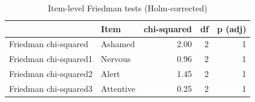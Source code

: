 \begin{table}[!h]
\centering
\caption{\label{tab:tab:item_friedman}Item-level Friedman tests (Holm-corrected)}
\centering
\begin{tabular}[t]{llrrr}
\toprule
  & Item & chi-squared & df & p (adj)\\
\midrule
Friedman chi-squared & Ashamed & 2.00 & 2 & 1\\
Friedman chi-squared1 & Nervous & 0.96 & 2 & 1\\
Friedman chi-squared2 & Alert & 1.45 & 2 & 1\\
Friedman chi-squared3 & Attentive & 0.25 & 2 & 1\\
\bottomrule
\end{tabular}
\end{table}
